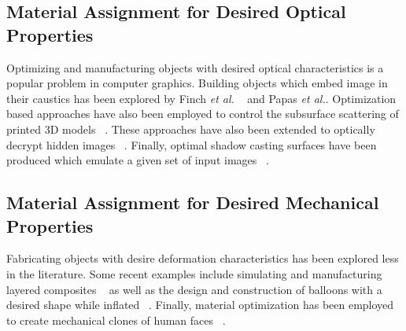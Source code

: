 \documentclass[annual]{acmsiggraph}
\begin{document}
\subsection{Material Assignment for Desired Optical Properties}
Optimizing and manufacturing objects with desired optical characteristics is a popular problem in computer graphics. Building objects which embed image in their caustics has been explored by Finch \textit{et al.} ~ and Papas \textit{et al.}. Optimization based approaches have also been employed to control the subsurface scattering of printed 3D models ~\cite{Hasan:2010}. These approaches have also been extended to optically decrypt hidden images ~\cite{Papas:2012}. Finally, optimal shadow casting surfaces have been produced which emulate a given set of input images ~\cite{Bermano:2012}.
\subsection{Material Assignment for Desired Mechanical Properties}
Fabricating objects with desire deformation characteristics has been explored less in the literature. Some recent examples include simulating and manufacturing layered composites ~\cite{Bickel:2010} as well as the design and construction of balloons with a desired shape while inflated ~\cite{sko:2012}. Finally, material optimization has been employed to create mechanical clones of human faces ~\cite{Bickel:2012}.
\end{document}
